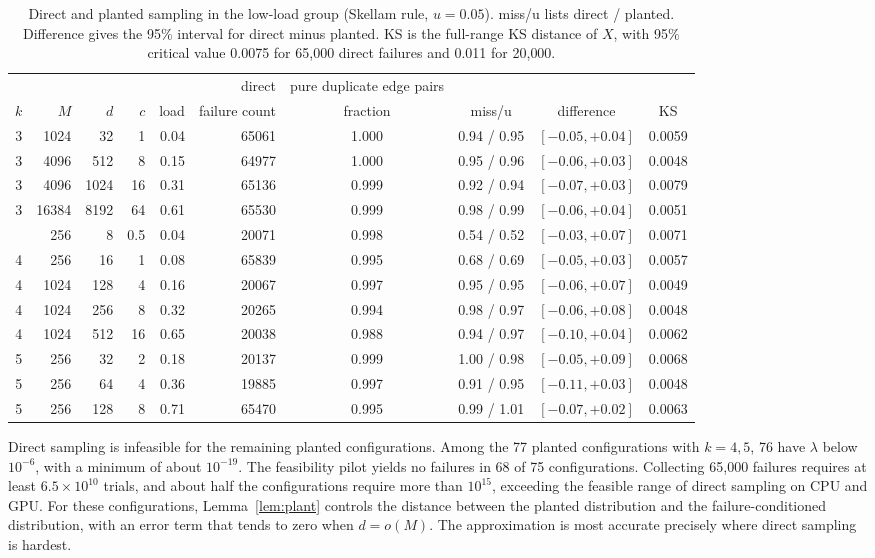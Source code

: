 \begin{table}[!htbp]
\centering
\caption{Direct and planted sampling in the low-load group (Skellam rule, $u=0.05$). miss/u lists direct / planted. Difference gives the 95\% interval for direct minus planted. KS is the full-range KS distance of $X$, with 95\% critical value 0.0075 for 65{,}000 direct failures and 0.011 for 20{,}000.}
\label{tab:v-low}
\small
\begin{tabular}{@{}rrrrrrcccc@{}}
\toprule
& & & & & direct & pure duplicate edge pairs & & & \\
$k$ & $M$ & $d$ & $c$ & load & failure count & fraction & miss/u & difference & KS\\
\midrule
3 & 1024 & 32 & 1 & 0.04 & 65061 & 1.000 & 0.94 / 0.95 & $[-0.05,+0.04]$ & 0.0059\\
3 & 4096 & 512 & 8 & 0.15 & 64977 & 1.000 & 0.95 / 0.96 & $[-0.06,+0.03]$ & 0.0048\\
3 & 4096 & 1024 & 16 & 0.31 & 65136 & 0.999 & 0.92 / 0.94 & $[-0.07,+0.03]$ & 0.0079\\
3 & 16384 & 8192 & 64 & 0.61 & 65530 & 0.999 & 0.98 / 0.99 & $[-0.06,+0.04]$ & 0.0051\\
\addlinespace
4 & 256 & 8 & 0.5 & 0.04 & 20071 & 0.998 & 0.54 / 0.52 & $[-0.03,+0.07]$ & 0.0071\\
4 & 256 & 16 & 1 & 0.08 & 65839 & 0.995 & 0.68 / 0.69 & $[-0.05,+0.03]$ & 0.0057\\
4 & 1024 & 128 & 4 & 0.16 & 20067 & 0.997 & 0.95 / 0.95 & $[-0.06,+0.07]$ & 0.0049\\
4 & 1024 & 256 & 8 & 0.32 & 20265 & 0.994 & 0.98 / 0.97 & $[-0.06,+0.08]$ & 0.0048\\
4 & 1024 & 512 & 16 & 0.65 & 20038 & 0.988 & 0.94 / 0.97 & $[-0.10,+0.04]$ & 0.0062\\
5 & 256 & 32 & 2 & 0.18 & 20137 & 0.999 & 1.00 / 0.98 & $[-0.05,+0.09]$ & 0.0068\\
5 & 256 & 64 & 4 & 0.36 & 19885 & 0.997 & 0.91 / 0.95 & $[-0.11,+0.03]$ & 0.0048\\
5 & 256 & 128 & 8 & 0.71 & 65470 & 0.995 & 0.99 / 1.01 & $[-0.07,+0.02]$ & 0.0063\\
\bottomrule
\end{tabular}
\end{table}

Direct sampling is infeasible for the remaining planted configurations. Among the 77 planted configurations with $k=4,5$, 76 have $\lambda$ below $10^{-6}$, with a minimum of about $10^{-19}$. The feasibility pilot yields no failures in 68 of 75 configurations. Collecting 65{,}000 failures requires at least $6.5\times10^{10}$ trials, and about half the configurations require more than $10^{15}$, exceeding the feasible range of direct sampling on CPU and GPU. For these configurations, Lemma~\ref{lem:plant} controls the distance between the planted distribution and the failure-conditioned distribution, with an error term that tends to zero when $d=o(M)$. The approximation is most accurate precisely where direct sampling is hardest.

